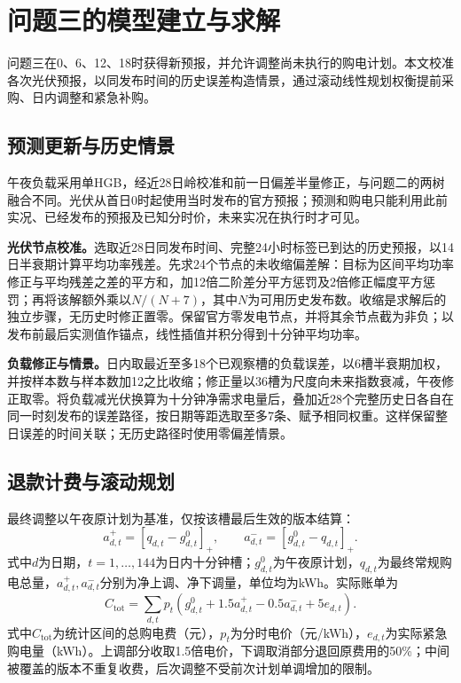 \section{问题三的模型建立与求解}
\label{sec:q3}

问题三在0、6、12、18时获得新预报，并允许调整尚未执行的购电计划。本文校准各次光伏预报，以同发布时间的历史误差构造情景，通过滚动线性规划权衡提前采购、日内调整和紧急补购。

\subsection{预测更新与历史情景}

午夜负载采用单HGB，经近28日岭校准和前一日偏差半量修正，与问题二的两树融合不同。光伏从首日0时起使用当时发布的官方预报；预测和购电只能利用此前实况、已经发布的预报及已知分时价，未来实况在执行时才可见。

\textbf{光伏节点校准。}选取近28日同发布时间、完整24小时标签已到达的历史预报，以14日半衰期计算平均功率残差。先求24个节点的未收缩偏差解：目标为区间平均功率修正与平均残差之差的平方和，加12倍二阶差分平方惩罚及2倍修正幅度平方惩罚；再将该解额外乘以$N/(N+7)$，其中$N$为可用历史发布数。收缩是求解后的独立步骤，无历史时修正置零。保留官方零发电节点，并将其余节点截为非负；以发布前最后实测值作锚点，线性插值并积分得到十分钟平均功率。

\textbf{负载修正与情景。}日内取最近至多18个已观察槽的负载误差，以6槽半衰期加权，并按样本数与样本数加12之比收缩；修正量以36槽为尺度向未来指数衰减，午夜修正取零。将负载减光伏换算为十分钟净需求电量后，叠加近28个完整历史日各自在同一时刻发布的误差路径，按日期等距选取至多7条、赋予相同权重。这样保留整日误差的时间关联；无历史路径时使用零偏差情景。

\subsection{退款计费与滚动规划}

最终调整以午夜原计划为基准，仅按该槽最后生效的版本结算：
\begin{equation}\label{eq:q3-adjustment}
 a^+_{d,t}=[q_{d,t}-g^0_{d,t}]_+,\qquad
 a^-_{d,t}=[g^0_{d,t}-q_{d,t}]_+.
\end{equation}
式中$d$为日期，$t=1,\ldots,144$为日内十分钟槽；$g^0_{d,t}$为午夜原计划，$q_{d,t}$为最终常规购电总量，$a^+_{d,t},a^-_{d,t}$分别为净上调、净下调量，单位均为kWh。实际账单为
\begin{equation}\label{eq:q3-bill}
 C_{\mathrm{tot}}=\sum_{d,t}p_t
 \left(g^0_{d,t}+1.5a^+_{d,t}-0.5a^-_{d,t}+5e_{d,t}\right).
\end{equation}
式中$C_{\mathrm{tot}}$为统计区间的总购电费（元），$p_t$为分时电价（元/kWh），$e_{d,t}$为实际紧急购电量（kWh）。上调部分收取1.5倍电价，下调取消部分退回原费用的50\%；中间被覆盖的版本不重复收费，后次调整不受前次计划单调增加的限制。

